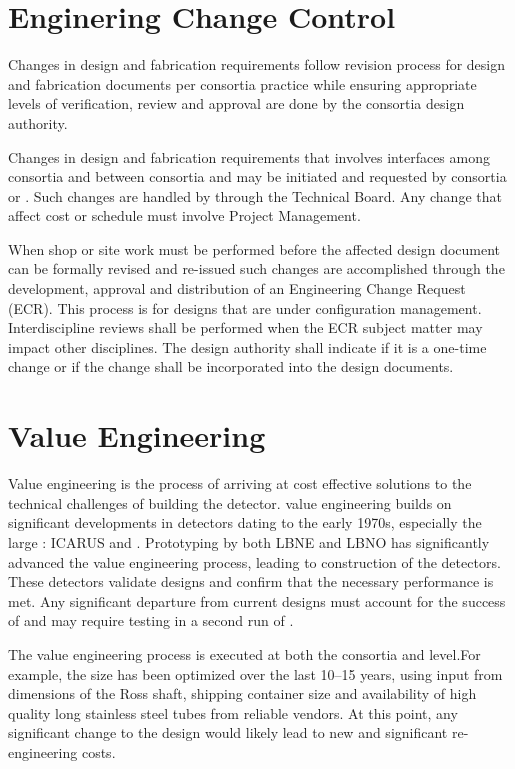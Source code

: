 \section{Enginering Change Control}
\label{sec:fdsp-change}

Changes in design and fabrication requirements follow revision process
for design and fabrication documents per consortia practice while
ensuring appropriate levels of verification, review and approval are
done by the consortia design authority.

Changes in design and fabrication requirements that involves
interfaces among consortia and between consortia and  may be
initiated and requested by consortia or . Such changes are
handled by  through the Technical Board. Any change that
affect cost or schedule must involve Project Management.

When shop or site work must be performed before the affected design
document can be formally revised and re-issued such changes are
accomplished through the development, approval and distribution of an
Engineering Change Request (ECR). This process is for designs that are
under configuration management. Interdiscipline reviews shall be
performed when the ECR subject matter may impact other
disciplines. The design authority shall indicate if it is a one-time
change or if the change shall be incorporated into the design
documents.



\section{Value Engineering}
\label{sec:fdsp-coord-ve}

Value engineering is the process of arriving at cost effective
solutions to the technical challenges of building the 
detector.  value engineering builds on significant
developments in  detectors dating to the early 1970s,
especially the large : ICARUS and
. Prototyping by both LBNE and LBNO has
significantly advanced the value engineering process, leading to
construction of the  detectors. These detectors validate
 designs and confirm that the necessary performance is
met. Any significant departure from current designs must account for
the success of  and may require testing in a second
run of . 

The value engineering process is executed at both the consortia and
 level.For example, the  size has been optimized
over the last 10--15 years, using input from dimensions of the Ross
shaft, shipping container size and availability of high quality long
stainless steel tubes from reliable vendors.  At this point, any
significant change to the  design would likely lead to new
and significant re-engineering costs.

